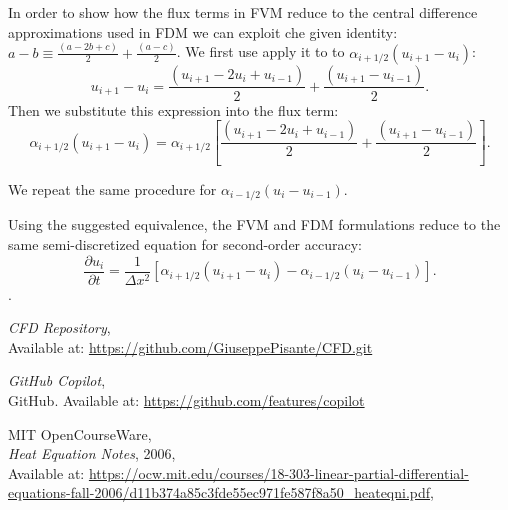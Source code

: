 \documentclass{article}
\begin{document}
In order to show how the flux terms in FVM reduce to the central difference approximations used in FDM we can exploit che given identity: \(a - b \equiv \frac{(a - 2b + c)}{2} + \frac{(a - c)}{2}\).
We first use apply it to to \( \alpha_{i+1/2} (u_{i+1} - u_i) \):
\[
u_{i+1} - u_i = \frac{(u_{i+1} - 2u_i + u_{i-1})}{2} + \frac{(u_{i+1} - u_{i-1})}{2}.
\]
Then we substitute this expression into the flux term:
\[
\alpha_{i+1/2} (u_{i+1} - u_i) = \alpha_{i+1/2} \left[ \frac{(u_{i+1} - 2u_i + u_{i-1})}{2} + \frac{(u_{i+1} - u_{i-1})}{2} \right].
\]

We repeat the same procedure for \( \alpha_{i-1/2} (u_i - u_{i-1}) \).

Using the suggested equivalence, the FVM and FDM formulations reduce to the same semi-discretized equation for second-order accuracy:
\[
\frac{\partial u_i}{\partial t} = \frac{1}{\Delta x^2} \left[ \alpha_{i+1/2} (u_{i+1} - u_i) - \alpha_{i-1/2} (u_i - u_{i-1}) \right].
\].



\begin{thebibliography}{9}
    \textit{CFD Repository},\\
    Available at: \url{https://github.com/GiuseppePisante/CFD.git}
    
    \textit{GitHub Copilot},\\
    GitHub. Available at: \url{https://github.com/features/copilot}
    
    MIT OpenCourseWare,\\
    \textit{Heat Equation Notes}, 2006,\\
    Available at: \url{https://ocw.mit.edu/courses/18-303-linear-partial-differential-equations-fall-2006/d11b374a85c3fde55ec971fe587f8a50_heateqni.pdf},\\
  \end{thebibliography}
  
  
\end{document}
